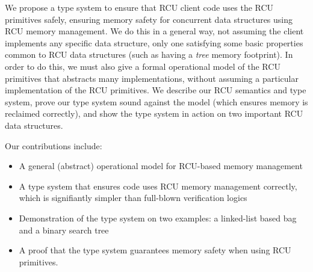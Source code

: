 We propose a type system to ensure that RCU client code uses the RCU primitives safely, ensuring memory safety for concurrent data structures using RCU memory management.
We do this in a general way, not assuming the client implements any specific data structure, only one satisfying some basic properties common to RCU data structures (such as having a \textit{tree} memory footprint).  In order to do this, we must also give a formal operational model of the RCU primitives that abstracts many implementations, without assuming a particular implementation of the RCU primitives.
We describe our RCU semantics and type system, prove our type system sound against the model (which ensures memory is reclaimed correctly), and show the type system in action on two important RCU data structures.

Our contributions include:
\begin{itemize}
\item A general (abstract) operational model for RCU-based memory management
\item A type system that ensures code uses RCU memory management correctly, which is signifiantly simpler than full-blown verification logics
\item Demonstration of the type system on two examples: a linked-list based bag and a binary search tree  
\item A proof that the type system guarantees memory safety when using RCU primitives.
\end{itemize}
